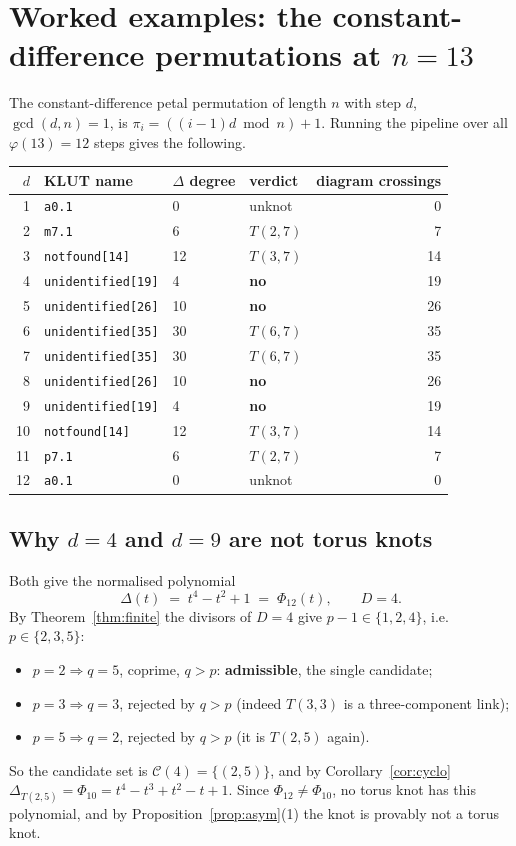 \documentclass[11pt]{article}
\theoremstyle{definition}
\newcommand{\Deltaa}{\Delta}
\newcommand{\T}[2]{T(#1,#2)}
\newcommand{\Cyc}[1]{\Phi_{#1}}
\newcommand{\code}[1]{\texttt{#1}}
\begin{document}
\section{Worked examples: the constant-difference permutations at \texorpdfstring{$n=13$}{n=13}}

The constant-difference petal permutation of length $n$ with step $d$, $\gcd(d,n)=1$, is
$\pi_{i} = ((i-1)d \bmod n) + 1$. Running the pipeline over all $\varphi(13)=12$ steps
gives the following.

\begin{center}
\begin{tabular}{@{}rlllr@{}}
\toprule
$d$ & KLUT name & $\Deltaa$ degree & verdict & diagram crossings \\
\midrule
1  & \code{a0.1}             & 0  & unknot   & 0 \\
2  & \code{m7.1}             & 6  & $\T{2}{7}$ & 7 \\
3  & \code{notfound[14]}     & 12 & $\T{3}{7}$ & 14 \\
4  & \code{unidentified[19]} & 4  & \textbf{no} & 19 \\
5  & \code{unidentified[26]} & 10 & \textbf{no} & 26 \\
6  & \code{unidentified[35]} & 30 & $\T{6}{7}$ & 35 \\
7  & \code{unidentified[35]} & 30 & $\T{6}{7}$ & 35 \\
8  & \code{unidentified[26]} & 10 & \textbf{no} & 26 \\
9  & \code{unidentified[19]} & 4  & \textbf{no} & 19 \\
10 & \code{notfound[14]}     & 12 & $\T{3}{7}$ & 14 \\
11 & \code{p7.1}             & 6  & $\T{2}{7}$ & 7 \\
12 & \code{a0.1}             & 0  & unknot   & 0 \\
\bottomrule
\end{tabular}
\end{center}

\subsection{Why \texorpdfstring{$d=4$}{d=4} and \texorpdfstring{$d=9$}{d=9} are not torus knots}

Both give the normalised polynomial
\[
\Deltaa(t) \;=\; t^{4}-t^{2}+1 \;=\; \Cyc{12}(t),
\qquad D=4 .
\]
By Theorem~\ref{thm:finite} the divisors of $D=4$ give $p-1\in\{1,2,4\}$, i.e.\
$p\in\{2,3,5\}$:
\begin{itemize}
\item $p=2 \Rightarrow q=5$, coprime, $q>p$: \textbf{admissible}, the single candidate;
\item $p=3 \Rightarrow q=3$, rejected by $q>p$ (indeed $\T{3}{3}$ is a three-component link);
\item $p=5 \Rightarrow q=2$, rejected by $q>p$ (it is $\T{2}{5}$ again).
\end{itemize}
So the candidate set is $\mathcal{C}(4)=\{(2,5)\}$, and by Corollary~\ref{cor:cyclo}
$\Deltaa_{\T{2}{5}} = \Cyc{10} = t^{4}-t^{3}+t^{2}-t+1$. Since
$\Cyc{12}\neq\Cyc{10}$, no torus knot has this polynomial, and by
Proposition~\ref{prop:asym}(1) the knot is provably not a torus knot.
\end{document}
